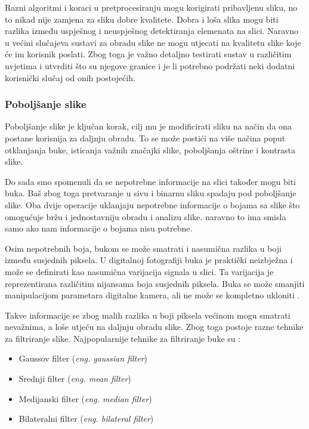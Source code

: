 \documentclass{foi}
\begin{document}
Razni algoritmi i koraci u pretprocesiranju mogu korigirati pribavljenu sliku, no to nikad nije zamjena za sliku dobre kvalitete. Dobra i loša slika mogu biti razlika između uspješnog i neuspješnog detektiranja elemenata na slici. Naravno u većini slučajeva sustavi za obradu slike ne mogu utjecati na kvalitetu slike koje će im korisnik poslati. Zbog toga je važno detaljno testirati sustav u različitim uvjetima i utvrditi što su njegove granice i je li potrebno podržati neki dodatni korisnički slučaj od onih postojećih.
\subsubsection{Poboljšanje slike}

Poboljšanje slike je ključan korak, cilj mu je modificirati sliku na način da ona postane korisnija za daljnju obradu. To se može postići na više načina poput otklanjanja buke, isticanja važnih značajki slike, poboljšanja oštrine i kontrasta slike.

Do sada smo spomenuli da se nepotrebne informacije na slici također mogu biti buka. Baš zbog toga pretvaranje u sivu i binarnu sliku spadaju pod poboljšanje slike. Oba dvije operacije uklanjaju nepotrebne informacije o bojama sa slike što omogućuje bržu i jednostavniju obradu i analizu slike. naravno to ima smisla samo ako nam informacije o bojama nisu potrebne.

Osim nepotrebnih boja, bukom se može smatrati i nasumična razlika u boji između susjednih piksela. U digitalnoj fotografiji buka je praktički neizbježna i može se definirati kao nasumična varijacija signala u slici. Ta varijacija je reprezentirana različitim nijansama boja susjednih piksela. Buka se može smanjiti manipulacijom parametara digitalne kamera, ali ne može se kompletno ukloniti \cite{Adobe}.

Takve informacije se zbog malih razlika u boji piksela većinom mogu smatrati nevažnima, a loše utječu na daljnju obradu slike. Zbog toga postoje razne tehnike za filtriranje slike. Najpopularnije tehnike za filtriranje buke su \cite{Swain2023Jul}:

\begin{itemize}
    \item Gaussov filter (\textit{eng. gaussian filter})
    \item Srednji filter (\textit{eng. mean filter})
    \item Medijanski filter (\textit{eng. median filter})
    \item Bilateralni filter (\textit{eng. bilateral filter})
\end{itemize}
\end{document}
